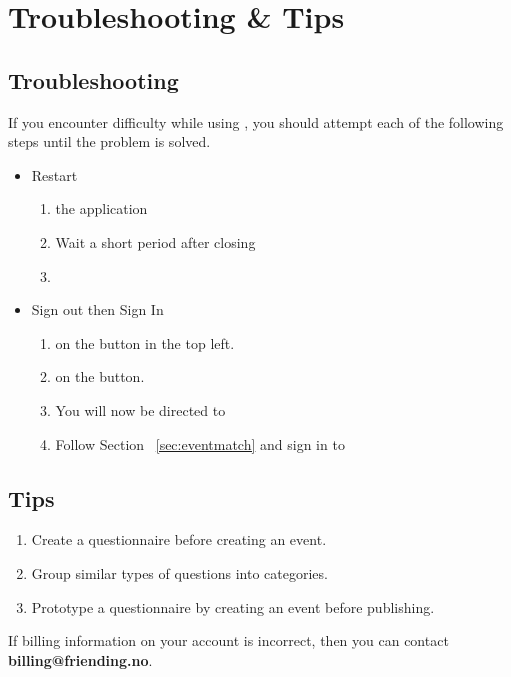 \section{Troubleshooting \& Tips}
\label{sec:troubleshootandtips}

\subsection{Troubleshooting}
\label{sec:troubleshoot}
If you encounter difficulty while using \Friending{}, you should attempt each of the following steps until the problem is solved.

\begin{itemize}
\item Restart \Friending{}
\begin{enumerate}
\item {} the application
\item Wait a short period  after closing
\item {} \Friending{}
\end{enumerate}
\item Sign out then Sign In
\begin{enumerate}
\setNavigationMenuColor
\item {} on the  button in the top left.
\item {} on the  button.
\item You will now be directed to 
\item Follow Section ~\ref{sec:eventmatch} and sign in to \Friending{}
\setDefaultMenuColor
\end{enumerate}
\end{itemize}
\subsection{Tips}
\label{sec:tips}
\begin{enumerate}
\item Create a questionnaire before creating an event.
\item Group similar types of questions into categories.
\item Prototype a questionnaire by creating an event before publishing.
\end{enumerate}

If billing information on your account is incorrect, then you can contact \textbf{{billing@friending.no}}.